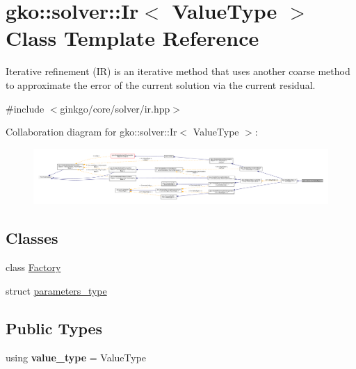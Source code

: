\hypertarget{classgko_1_1solver_1_1Ir}{}\section{gko\+:\+:solver\+:\+:Ir$<$ Value\+Type $>$ Class Template Reference}
\label{classgko_1_1solver_1_1Ir}


Iterative refinement (IR) is an iterative method that uses another coarse method to approximate the error of the current solution via the current residual.  




{\ttfamily \#include $<$ginkgo/core/solver/ir.\+hpp$>$}



Collaboration diagram for gko\+:\+:solver\+:\+:Ir$<$ Value\+Type $>$\+:
\nopagebreak
\begin{figure}[H]
\begin{center}
\leavevmode
\includegraphics[width=350pt]{classgko_1_1solver_1_1Ir__coll__graph}
\end{center}
\end{figure}
\subsection*{Classes}
\begin{DoxyCompactItemize}
\item 
class \hyperlink{classgko_1_1solver_1_1Ir_1_1Factory}{Factory}
\item 
struct \hyperlink{structgko_1_1solver_1_1Ir_1_1parameters__type}{parameters\+\_\+type}
\end{DoxyCompactItemize}
\subsection*{Public Types}
\begin{DoxyCompactItemize}
\item 
\mbox{\label{classgko_1_1solver_1_1Ir_a1f746b0af41665271dd337196525f425}} 
using {\bfseries value\+\_\+type} = Value\+Type
\end{DoxyCompactItemize}
